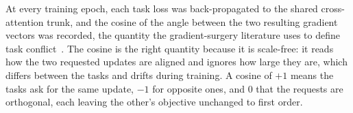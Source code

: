 At every training epoch, each task loss was back-propagated to the shared cross-attention trunk, and
the cosine of the angle between the two resulting gradient vectors was recorded, the quantity the
gradient-surgery literature uses to define task conflict~\cite{yu2020pcgrad}. The cosine is the
right quantity because it is scale-free: it reads how the two requested updates are aligned and
ignores how large they are, which differs between the tasks and drifts during training. A cosine of
$+1$ means the tasks ask for the same update, $-1$ for opposite ones, and $0$ that the requests are
orthogonal, each leaving the other's objective unchanged to first order.

